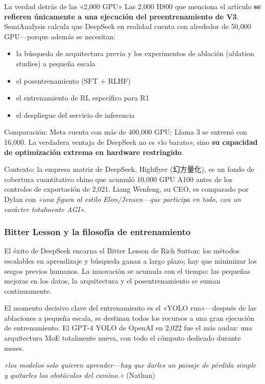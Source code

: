 \documentclass[a4paper]{article}
\begin{document}
\begin{warningbox}{La verdad detrás de las «2,000 GPU»}
Las 2,000 H800 que menciona el artículo \textbf{se refieren únicamente a una ejecución del preentrenamiento de V3}. SemiAnalysis calcula que DeepSeek en realidad cuenta con alrededor de 50,000 GPU—porque además se necesitan:
\begin{itemize}
    \item la búsqueda de arquitectura previa y los experimentos de ablación (ablation studies) a pequeña escala
    \item el posentrenamiento (SFT + RLHF)
    \item el entrenamiento de RL específico para R1
    \item el despliegue del servicio de inferencia
\end{itemize}

Comparación: Meta cuenta con más de 400,000 GPU; Llama 3 se entrenó con 16,000. La verdadera ventaja de DeepSeek no es «lo barato», sino \textbf{su capacidad de optimización extrema en hardware restringido}.

Contexto: la empresa matriz de DeepSeek, Highflyer (幻方量化), es un fondo de cobertura cuantitativo chino que acumuló 10,000 GPU A100 antes de los controles de exportación de 2,021. Liang Wenfeng, su CEO, es comparado por Dylan con \textit{«una figura al estilo Elon/Jensen—que participa en todo, con un carácter totalmente AGI»}.
\end{warningbox}

\subsubsection{Bitter Lesson y la filosofía de entrenamiento}

El éxito de DeepSeek encarna el Bitter Lesson de Rich Sutton: los métodos escalables en aprendizaje y búsqueda ganan a largo plazo; hay que minimizar los sesgos previos humanos. La innovación se acumula con el tiempo: las pequeñas mejoras en los datos, la arquitectura y el posentrenamiento se suman continuamente.

El momento decisivo clave del entrenamiento es el «YOLO run»—después de las ablaciones a pequeña escala, se destinan todos los recursos a una gran ejecución de entrenamiento. El GPT-4 YOLO de OpenAI en 2,022 fue el más audaz: una arquitectura MoE totalmente nueva, con todo el cómputo dedicado durante meses.

\textit{«los modelos solo quieren aprender—hay que darles un paisaje de pérdida simple y quitarles los obstáculos del camino.»} (Nathan)
\end{document}
